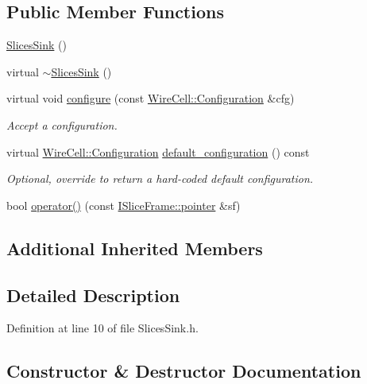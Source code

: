 \subsection*{Public Member Functions}
\begin{DoxyCompactItemize}
\item 
\hyperlink{class_wire_cell_1_1_img_1_1_slices_sink_ae45b2713073d1ba503cdcd076f472303}{Slices\+Sink} ()
\item 
virtual \hyperlink{class_wire_cell_1_1_img_1_1_slices_sink_a75f494e0d83275ce37a122ccd4ba02a5}{$\sim$\+Slices\+Sink} ()
\item 
virtual void \hyperlink{class_wire_cell_1_1_img_1_1_slices_sink_ae4651147b7d4f99b8a1e04c4552359e4}{configure} (const \hyperlink{namespace_wire_cell_a9f705541fc1d46c608b3d32c182333ee}{Wire\+Cell\+::\+Configuration} \&cfg)
\begin{DoxyCompactList}\small\item\em Accept a configuration. \end{DoxyCompactList}\item 
virtual \hyperlink{namespace_wire_cell_a9f705541fc1d46c608b3d32c182333ee}{Wire\+Cell\+::\+Configuration} \hyperlink{class_wire_cell_1_1_img_1_1_slices_sink_a90643c1f80defa08566ee3b1d6592768}{default\+\_\+configuration} () const
\begin{DoxyCompactList}\small\item\em Optional, override to return a hard-\/coded default configuration. \end{DoxyCompactList}\item 
bool \hyperlink{class_wire_cell_1_1_img_1_1_slices_sink_a61795e2f755f0dc99b56914f236a7f83}{operator()} (const \hyperlink{class_wire_cell_1_1_i_data_aff870b3ae8333cf9265941eef62498bc}{I\+Slice\+Frame\+::pointer} \&sf)
\end{DoxyCompactItemize}
\subsection*{Additional Inherited Members}


\subsection{Detailed Description}


Definition at line 10 of file Slices\+Sink.\+h.



\subsection{Constructor \& Destructor Documentation}
\mbox{\label{class_wire_cell_1_1_img_1_1_slices_sink_ae45b2713073d1ba503cdcd076f472303}} 
